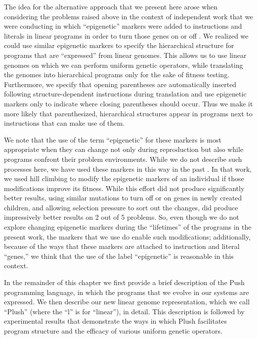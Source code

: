 \documentclass[graybox]{svmult}
\begin{document}
The idea for the alternative approach that we present here arose when considering the problems raised above in the context of independent work that we were conducting in which ``epigenetic'' markers were added to instructions and literals in linear programs in order to turn those genes on or off \cite{LaCava:2014:GPTP, LaCava:2014:GECCOcomp, LaCava:2015:GECCO}.
We realized we could use similar epigenetic markers to specify the hierarchical structure for programs that are ``expressed'' from linear genomes. This allows us to use linear genomes on which we can perform uniform genetic operators, while translating the genomes into hierarchical programs only for the sake of fitness testing.
Furthermore, we specify that opening parentheses are automatically inserted following structure-dependent instructions during translation and use epigenetic markers only to indicate where closing parentheses should occur. Thus we make it more likely that parenthesized, hierarchical structures appear in programs next to instructions that can make use of them.

We note that the use of the term ``epigenetic'' for these markers is most appropriate when they can change not only during reproduction but also while programs confront their problem environments. While we do not describe such processes here, we have used these markers in this way in the past \cite{LaCava:2015:GECCO}. In that work, we used hill climbing to modify the epigenetic markers of an individual if those modifications improve its fitness. While this effort did not produce significantly better results, using similar mutations to turn off or on genes in newly created children, and allowing selection pressure to sort out the changes, did produce impressively better results on 2 out of 5 problems. So, even though we do not explore changing epigenetic markers during the ``lifetimes'' of the programs in the present work, the markers that we use do enable such modifications; additionally, because of the ways that these markers are attached to instruction and literal ``genes,'' we think that the use of the label ``epigenetic'' is reasonable in this context.

In the remainder of this chapter we first provide a brief description of the Push programming language, in which the programs that we evolve in our systems are expressed. We then describe our new linear genome representation, which we call ``Plush'' (where the ``l'' is for ``linear''), in detail. This description is followed by experimental results that demonstrate the ways in which Plush facilitates program structure and the efficacy of various uniform genetic operators.
\end{document}
